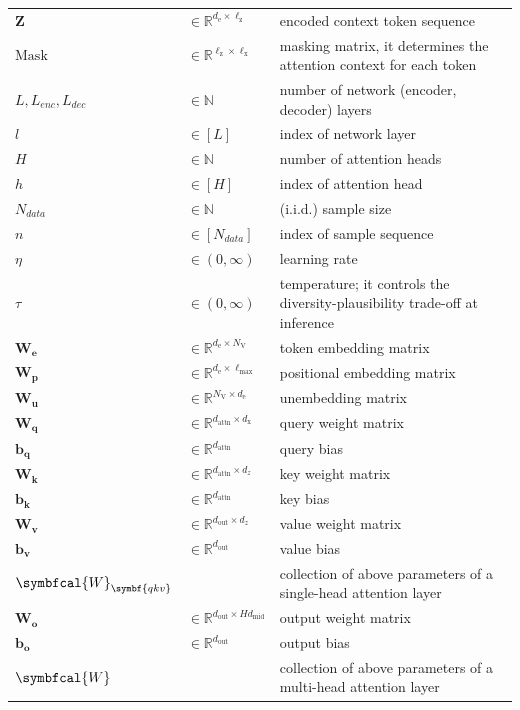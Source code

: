 \documentclass[12pt]{article}
\begin{document}
\begin{longtable}{@{} p{} p{} p{} @{}}
$\symbf{Z}$ & $\in\mathbb{R}^{d_{\text{e}}\times\ell_{\text{z}}}$ & encoded context token sequence \\
$\mathrm{Mask}$ & $\in\mathbb{R}^{\ell_{\text{z}}\times\ell_{\text{x}}}$ & masking matrix, it determines the attention context for each token \\
$L,L_{enc},L_{dec}$ & $\in\mathbb{N}$ & number of network (encoder, decoder) layers \\
$l$ & $\in[L]$ & index of network layer \\
$H$ & $\in\mathbb{N}$ & number of attention heads \\
$h$ & $\in[H]$ & index of attention head \\
$N_{data}$ & $\in\mathbb{N}$ & (i.i.d.) sample size \\
$n$ & $\in[N_{data}]$ & index of sample sequence \\
$\eta$ & $\in(0,\infty)$ & learning rate \\
$\tau$ & $\in(0,\infty)$ & temperature; it controls the diversity-plausibility trade-off at inference \\
$\symbf{W_e}$ & $\in\mathbb{R}^{d_{\text{e}}\times N_{\text{V}}}$ & token embedding matrix \\
$\symbf{W_p}$ & $\in\mathbb{R}^{d_{\text{e}}\times\ell_{\text{max}}}$ & positional embedding matrix \\
$\symbf{W_u}$ & $\in\mathbb{R}^{N_{\text{V}}\times d_{\text{e}}}$ & unembedding matrix \\
$\symbf{W_q}$ & $\in\mathbb{R}^{d_\text{attn}\times d_\text{x}}$ & query weight matrix \\
$\symbf{b_q}$ & $\in\mathbb{R}^{d_\text{attn}}$ & query bias \\
$\symbf{W_k}$ & $\in\mathbb{R}^{d_\text{attn}\times d_z}$ & key weight matrix \\
$\symbf{b_k}$ & $\in\mathbb{R}^{d_\text{attn}}$ & key bias \\
$\symbf{W_v}$ & $\in\mathbb{R}^{d_\text{out}\times d_z}$ & value weight matrix \\
$\symbf{b_v}$ & $\in\mathbb{R}^{d_\text{out}}$ & value bias \\
$\symbfcal{W}_{\symbf{qkv}}$ & & collection of above parameters of a single-head attention layer \\
$\symbf{W_o}$ & $\in\mathbb{R}^{d_\text{out}\times Hd_\text{mid}}$ & output weight matrix \\
$\symbf{b_o}$ & $\in\mathbb{R}^{d_\text{out}}$ & output bias \\
$\symbfcal{W}$ & & collection of above parameters of a multi-head attention layer \\

\end{longtable}
\end{document}
